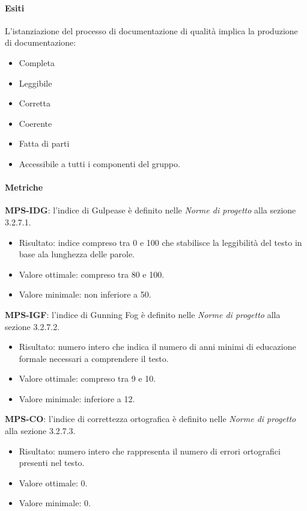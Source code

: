 \documentclass[../piano-di-qualifica.tex]{subfiles}
\begin{document}
\paragraph{Esiti}%
\label{par:esiti}
L'istanziazione del processo di documentazione di qualità implica la produzione di documentazione:
\begin{itemize}
  \item Completa
  \item Leggibile
  \item Corretta
  \item Coerente
  \item Fatta di parti
  \item Accessibile a tutti i componenti del gruppo.
\end{itemize}

\paragraph{Metriche}%
\label{par:metriche}

\textbf{MPS-IDG}: l'indice di Gulpease è definito nelle \textit{Norme di progetto} alla sezione 3.2.7.1.
\begin{itemize}
  \item Risultato: indice compreso tra 0 e 100 che stabilisce la leggibilità del testo in base ala lunghezza delle parole.
  \item Valore ottimale: compreso tra 80 e 100.
  \item Valore minimale: non inferiore a 50.
\end{itemize}

\textbf{MPS-IGF}: l'indice di Gunning Fog è definito nelle \textit{Norme di progetto} alla sezione 3.2.7.2.
\begin{itemize}
  \item Risultato: numero intero che indica il numero di anni minimi di educazione formale necessari a comprendere il testo.
  \item Valore ottimale: compreso tra 9 e 10.
  \item Valore minimale: inferiore a 12.
\end{itemize}

\textbf{MPS-CO}: l'indice di correttezza ortografica è definito nelle \textit{Norme di progetto} alla sezione 3.2.7.3.
\begin{itemize}
  \item Risultato: numero intero che rappresenta il numero di errori ortografici presenti nel testo.
  \item Valore ottimale: 0.
  \item Valore minimale: 0.
\end{itemize}
\end{document}
